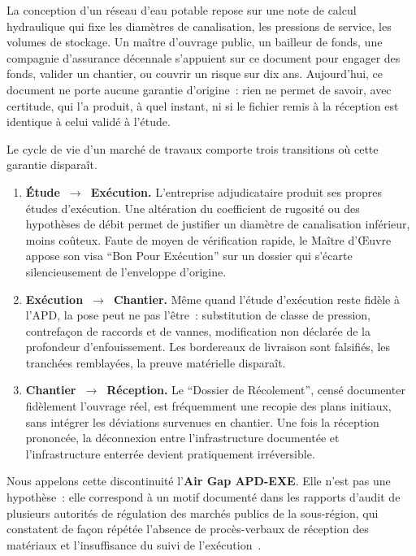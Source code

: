 \documentclass[11pt,a4paper]{article}
\begin{document}
La conception d'un réseau d'eau potable repose sur une note de calcul hydraulique qui fixe les diamètres de canalisation, les pressions de service, les volumes de stockage. Un maître d'ouvrage public, un bailleur de fonds, une compagnie d'assurance décennale s'appuient sur ce document pour engager des fonds, valider un chantier, ou couvrir un risque sur dix ans. Aujourd'hui, ce document ne porte aucune garantie d'origine~: rien ne permet de savoir, avec certitude, qui l'a produit, à quel instant, ni si le fichier remis à la réception est identique à celui validé à l'étude.

Le cycle de vie d'un marché de travaux comporte trois transitions où cette garantie disparaît.

\begin{enumerate}[leftmargin=1.4em, itemsep=2pt]
  \item \textbf{Étude~$\to$~Exécution.} L'entreprise adjudicataire produit ses propres études d'exécution. Une altération du coefficient de rugosité ou des hypothèses de débit permet de justifier un diamètre de canalisation inférieur, moins coûteux. Faute de moyen de vérification rapide, le Maître d'Œuvre appose son visa \enquote{Bon Pour Exécution} sur un dossier qui s'écarte silencieusement de l'enveloppe d'origine.
  \item \textbf{Exécution~$\to$~Chantier.} Même quand l'étude d'exécution reste fidèle à l'APD, la pose peut ne pas l'être~: substitution de classe de pression, contrefaçon de raccords et de vannes, modification non déclarée de la profondeur d'enfouissement. Les bordereaux de livraison sont falsifiés, les tranchées remblayées, la preuve matérielle disparaît.
  \item \textbf{Chantier~$\to$~Réception.} Le \enquote{Dossier de Récolement}, censé documenter fidèlement l'ouvrage réel, est fréquemment une recopie des plans initiaux, sans intégrer les déviations survenues en chantier. Une fois la réception prononcée, la déconnexion entre l'infrastructure documentée et l'infrastructure enterrée devient pratiquement irréversible.
\end{enumerate}

Nous appelons cette discontinuité l'\textbf{Air Gap APD-EXE}. Elle n'est pas une hypothèse~: elle correspond à un motif documenté dans les rapports d'audit de plusieurs autorités de régulation des marchés publics de la sous-région, qui constatent de façon répétée l'absence de procès-verbaux de réception des matériaux et l'insuffisance du suivi de l'exécution~\cite{arcop_togo_2015,arcop_senegal_2022}.
\end{document}
